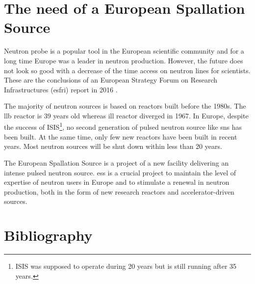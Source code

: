 \begin{refsection}
  

  \section{The need of a European Spallation Source}
  \label{ch1:Summary}
  Neutron probe is a popular tool in the European scientific community and for a long time Europe was a leader in neutron production. However, the future does not look so good with a decrease of the time access on neutron lines for scientists. These are the conclusions of an European Strategy Forum on Research Infrastructures (\acrshort{esfri}) report in 2016 \cite{neutron2016}.

  The majority of neutron sources is based on reactors built before the 1980s.
  The \acrshort{llb} reactor is 39 years old whereas \acrshort{ill} reactor diverged in 1967. In Europe, despite the success of ISIS\footnote{ISIS was supposed to operate during 20 years but is still running after 35 years.}, no second generation of pulsed neutron source like \acrshort{sns} has been built. At the same time, only few new reactors have been built in recent years. Most neutron sources will be shut down within less than 20 years.

  The European Spallation Source is a project of a new facility delivering an intense pulsed neutron source. \acrshort{ess} is a crucial project to maintain the level of expertise of neutron users in Europe and to stimulate a renewal in neutron production, both in the form of new research reactors and accelerator-driven sources.

  

  \cleardoublepage
  \section{Bibliography}

  \printbibliography[heading=subbibliography]
\end{refsection}
